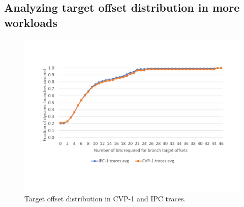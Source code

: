 


\subsection{Analyzing target offset distribution in more workloads}

\begin{figure}
\centering
\includegraphics[width=\columnwidth, trim=70 90 60 100, clip]{figures/CVP-IPC.pdf}
\caption{Target offset distribution in CVP-1 and IPC traces.}
\label{hpca:fig:cvp_res}
\end{figure}

